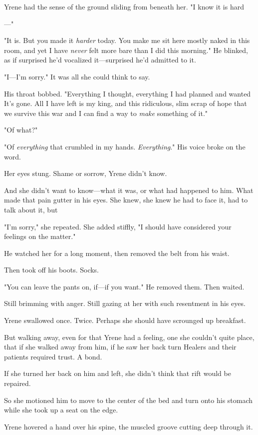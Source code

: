 Yrene had the sense of the ground sliding from beneath her. "I know it is hard

---"

"It is. But you made it \emph{harder} today. You make me sit here mostly naked in this room, and yet I have \emph{never} felt more bare than I did this morning." He blinked, as if surprised he'd vocalized it---surprised he'd admitted to it.

"I---I'm sorry." It was all she could think to say.

His throat bobbed. "Everything I thought, everything I had planned and wanted  It's gone. All I have left is my king, and this ridiculous, slim scrap of hope that we survive this war and I can find a way to \emph{make} something of it."

"Of what?"

"Of \emph{everything} that crumbled in my hands. \emph{Everything}." His voice broke on the word.

Her eyes stung. Shame or sorrow, Yrene didn't know.

And she didn't want to know---what it was, or what had happened to him. What made that pain gutter in his eyes. She knew, she knew he had to face it, had to talk about it, but 

"I'm sorry," she repeated. She added stiffly, "I should have considered your feelings on the matter."

He watched her for a long moment, then removed the belt from his waist.

Then took off his boots. Socks.

"You can leave the pants on, if---if you want." He removed them. Then waited.

Still brimming with anger. Still gazing at her with such resentment in his eyes.

Yrene swallowed once. Twice. Perhaps she should have scrounged up breakfast.

But walking away, even for that  Yrene had a feeling, one she couldn't quite place, that if she walked away from him, if he saw her back turn  Healers and their patients required trust. A bond.

If she turned her back on him and left, she didn't think that rift would be repaired.

So she motioned him to move to the center of the bed and turn onto his stomach while she took up a seat on the edge.

Yrene hovered a hand over his spine, the muscled groove cutting deep through it.

